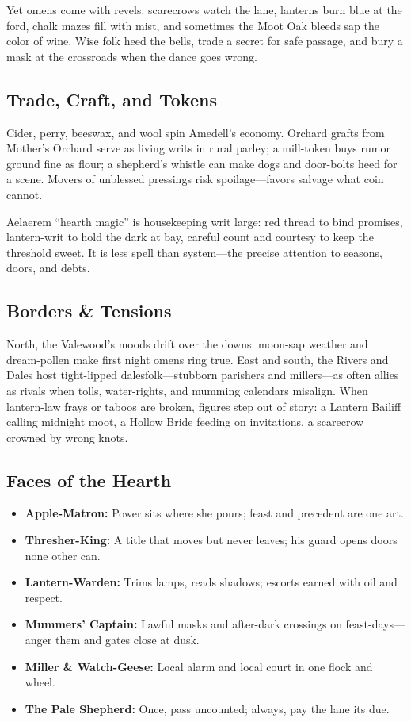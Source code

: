 \documentclass[11pt]{book}
\begin{document}
Yet omens come with revels: scarecrows watch the lane, lanterns burn blue at the ford, chalk mazes fill with mist, and sometimes the Moot Oak bleeds sap the color of wine. Wise folk heed the bells, trade a secret for safe passage, and bury a mask at the crossroads when the dance goes wrong.

\subsection*{Trade, Craft, and Tokens}
Cider, perry, beeswax, and wool spin Amedell's economy. Orchard grafts from Mother's Orchard serve as living writs in rural parley; a mill-token buys rumor ground fine as flour; a shepherd's whistle can make dogs and door-bolts heed for a scene. Movers of unblessed pressings risk spoilage---favors salvage what coin cannot.

Aelaerem ``hearth magic'' is housekeeping writ large: red thread to bind promises, lantern-writ to hold the dark at bay, careful count and courtesy to keep the threshold sweet. It is less spell than system---the precise attention to seasons, doors, and debts.

\subsection*{Borders \& Tensions}
North, the Valewood's moods drift over the downs: moon-sap weather and dream-pollen make first night omens ring true. East and south, the Rivers and Dales host tight-lipped dalesfolk---stubborn parishers and millers---as often allies as rivals when tolls, water-rights, and mumming calendars misalign. When lantern-law frays or taboos are broken, figures step out of story: a Lantern Bailiff calling midnight moot, a Hollow Bride feeding on invitations, a scarecrow crowned by wrong knots.

\subsection*{Faces of the Hearth}
\begin{itemize}
    \item \textbf{Apple-Matron:} Power sits where she pours; feast and precedent are one art.
    \item \textbf{Thresher-King:} A title that moves but never leaves; his guard opens doors none other can.
    \item \textbf{Lantern-Warden:} Trims lamps, reads shadows; escorts earned with oil and respect.
    \item \textbf{Mummers' Captain:} Lawful masks and after-dark crossings on feast-days---anger them and gates close at dusk.
    \item \textbf{Miller \& Watch-Geese:} Local alarm and local court in one flock and wheel.
    \item \textbf{The Pale Shepherd:} Once, pass uncounted; always, pay the lane its due.
\end{itemize}
\end{document}
